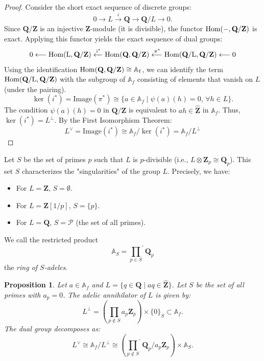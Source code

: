 \documentclass[11pt,a4paper]{article}
\newcommand{\Q}{\mathbf{Q}}
\newcommand{\Z}{\mathbf{Z}}
\newcommand{\A}{\mathbb{A}}
\newcommand{\Zhat}{\widehat{\Z}}
\def\Hom{\rm{Hom}}
\theoremstyle{plain}
\newtheorem{prop}[thm]{Proposition}
\theoremstyle{definition} %
\begin{document}
\begin{proof}
Consider the short exact sequence of discrete groups:
\[
0 \longrightarrow L \xrightarrow{i} \Q \longrightarrow \Q/L \longrightarrow 0.
\]
Since $\Q/\Z$ is an injective $\Z$-module (it is divisible), the functor $\Hom(-, \Q/\Z)$ is exact. Applying this functor yields the exact sequence of dual groups:
\[
0 \longleftarrow \Hom(L, \Q/\Z) \xleftarrow{i^*} \Hom(\Q, \Q/\Z) \xleftarrow{\pi^*} \Hom(\Q/L, \Q/\Z) \longleftarrow 0
\]
Using the identification $\Hom(\Q, \Q/\Z) \cong \A_f$, we can identify the term $\Hom(\Q/L, \Q/\Z)$ with the subgroup of $\A_f$ consisting of elements that vanish on $L$ (under the pairing).
\[
\ker(i^*) = \text{Image}(\pi^*) \cong \{ a \in \A_f \mid \psi(a)(h) = 0, \, \forall h \in L \}.
\]
The condition $\psi(a)(h) = 0$ in $\Q/\Z$ is equivalent to $ah \in \Zhat$ in $\A_f$. Thus, $\ker(i^*) = L^\perp$.
By the First Isomorphism Theorem:
\[
L^\vee = \text{Image}(i^*) \cong \A_f / \ker(i^*) = \A_f / L^\perp
\]
\end{proof}



Let $S$ be the set of primes $p$ such that $L$ is $p$-divisible (i.e., $L \otimes \Z_p \cong \Q_p$).
This set $S$ characterizes the "singularities" of the group $L$. Precisely, we have:
\begin{itemize}[leftmargin=*, labelindent=0pt]
    \item[] For $L = \Z$, $S = \emptyset$.
    \item[] For $L = \Z[1/p]$, $S = \{p\}$.
    \item[] For $L = \Q$, $S = \mathcal{P}$ (the set of all primes).
\end{itemize}
We call the restricted product 
\[
\A_S = {\prod_{p \in S}}^{'} \Q_p
\]
the \emph{ring of $S$-adeles}.


\begin{prop} Let $a\in \A_f$ and $L=\{q\in \Q\mid aq\in \Zhat\}$. Let $S$ be the set of all primes with $a_p=0$. 
The adelic annihilator of $L$ is given by:
\[
L^\perp = \left( \prod_{p \notin S}a_p \Z_p \right) \times \{0\}_S \subset \A_f.
\]
The dual group decomposes as:
\begin{equation}\label{dualgr}
L^\vee \cong \A_f / L^\perp \cong \left({\prod_{p \notin S}}^{'} \Q_p/a_p\Z_p\right) \times \A_S.
\end{equation}

\end{prop}
\end{document}
